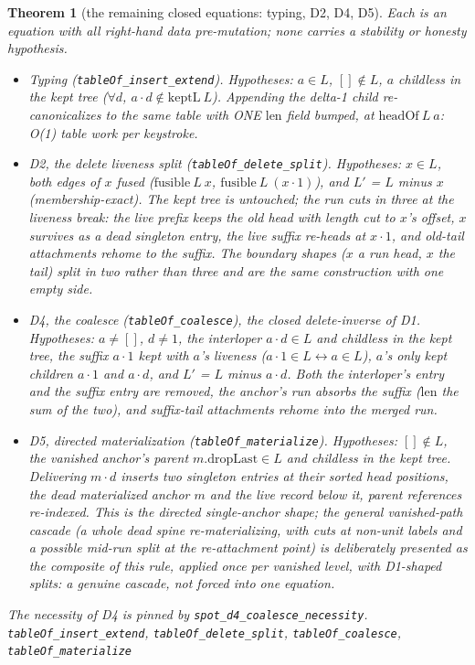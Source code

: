 \documentclass[11pt]{article}
\newtheorem{theorem}{Theorem}[section]
\newcommand{\lean}[1]{\texttt{#1}}
\begin{document}
\begin{theorem}[the remaining closed equations: typing, D2, D4, D5]
\label{thm:mutrules}
Each is an equation with all right-hand data pre-mutation; none
carries a stability or honesty hypothesis.
\begin{itemize}[leftmargin=2em]
\item \emph{Typing} (\lean{tableOf\_insert\_extend}). Hypotheses: $a
\in L$, $[] \notin L$, $a$ childless in the kept tree ($\forall d$,
$a \cdot d \notin \mathrm{keptL}\ L$). Appending the delta-1 child
re-canonicalizes to the same table with ONE $\mathrm{len}$ field
bumped, at $\mathrm{headOf}\ L\ a$: O(1) table work per keystroke.
\item \emph{D2, the delete liveness split}
(\lean{tableOf\_delete\_split}). Hypotheses: $x \in L$, both edges of
$x$ fused ($\mathrm{fusible}\ L\ x$, $\mathrm{fusible}\ L\ (x \cdot
1)$), and $L'$ = $L$ minus $x$ (membership-exact). The kept tree is
untouched; the run cuts in three at the liveness break: the live
prefix keeps the old head with length cut to $x$'s offset, $x$
survives as a dead singleton entry, the live suffix re-heads at $x
\cdot 1$, and old-tail attachments rehome to the suffix. The boundary
shapes ($x$ a run head, $x$ the tail) split in two rather than three
and are the same construction with one empty side.
\item \emph{D4, the coalesce} (\lean{tableOf\_coalesce}), the closed
delete-inverse of D1. Hypotheses: $a \neq []$, $d \neq 1$, the
interloper $a \cdot d \in L$ and childless in the kept tree, the
suffix $a \cdot 1$ kept with $a$'s liveness ($a \cdot 1 \in L
\leftrightarrow a \in L$), $a$'s only kept children $a \cdot 1$ and
$a \cdot d$, and $L'$ = $L$ minus $a \cdot d$. Both the interloper's
entry and the suffix entry are removed, the anchor's run absorbs the
suffix ($\mathrm{len}$ the sum of the two), and suffix-tail
attachments rehome into the merged run.
\item \emph{D5, directed materialization}
(\lean{tableOf\_materialize}). Hypotheses: $[] \notin L$, the
vanished anchor's parent $m.\mathrm{dropLast} \in L$ and childless in
the kept tree. Delivering $m \cdot d$ inserts two singleton entries
at their sorted head positions, the dead materialized anchor $m$ and
the live record below it, parent references re-indexed. This is the
directed single-anchor shape; the general vanished-path cascade (a
whole dead spine re-materializing, with cuts at non-unit labels and a
possible mid-run split at the re-attachment point) is deliberately
presented as the composite of this rule, applied once per vanished
level, with D1-shaped splits: a genuine cascade, not forced into one
equation.
\end{itemize}
The necessity of D4 is pinned by
\lean{spot\_d4\_coalesce\_necessity}.
\hfill\lean{tableOf\_insert\_extend}, \lean{tableOf\_delete\_split},
\lean{tableOf\_coalesce}, \lean{tableOf\_materialize}
\end{theorem}
\end{document}

